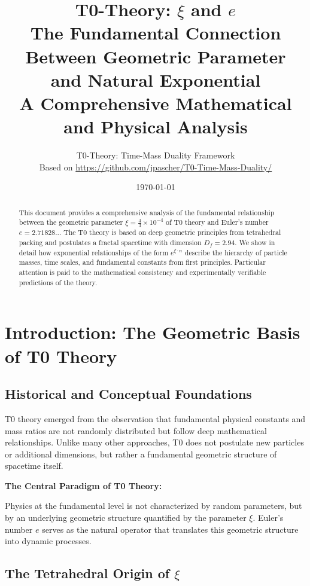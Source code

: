 \documentclass[12pt,a4paper]{article}
\title{\textbf{T0-Theory: $\xi$ and $e$}\\[0.5cm]
	\large The Fundamental Connection Between Geometric Parameter\\
	and Natural Exponential\\[0.3cm]
	\normalsize A Comprehensive Mathematical and Physical Analysis}
\author{T0-Theory: Time-Mass Duality Framework\\ \small Based on \url{https://github.com/jpascher/T0-Time-Mass-Duality/}}
\date{\today}
\newcommand{\xipar}{\xi}
\begin{document}
	
	\maketitle
	
	\begin{abstract}
		This document provides a comprehensive analysis of the fundamental relationship between the geometric parameter $\xipar = \frac{4}{3} \times 10^{-4}$ of T0 theory and Euler's number $e = 2.71828\ldots$ The T0 theory is based on deep geometric principles from tetrahedral packing and postulates a fractal spacetime with dimension $D_f = 2.94$. We show in detail how exponential relationships of the form $e^{\xipar \cdot n}$ describe the hierarchy of particle masses, time scales, and fundamental constants from first principles. Particular attention is paid to the mathematical consistency and experimentally verifiable predictions of the theory.
	\end{abstract}
	
	\tableofcontents
	\newpage
	
	\section{Introduction: The Geometric Basis of T0 Theory}
	
	\subsection{Historical and Conceptual Foundations}
	
	T0 theory emerged from the observation that fundamental physical constants and mass ratios are not randomly distributed but follow deep mathematical relationships. Unlike many other approaches, T0 does not postulate new particles or additional dimensions, but rather a fundamental geometric structure of spacetime itself.
	
	\begin{insight}
		\textbf{The Central Paradigm of T0 Theory:}
		
		Physics at the fundamental level is not characterized by random parameters, but by an underlying geometric structure quantified by the parameter $\xi$. Euler's number $e$ serves as the natural operator that translates this geometric structure into dynamic processes.
	\end{insight}
	
	\subsection{The Tetrahedral Origin of $\xi$}
	
\end{document}
